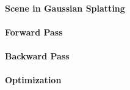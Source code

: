 \paragraph{Scene in Gaussian Splatting}


\paragraph{Forward Pass}


\paragraph{Backward Pass}


\paragraph{Optimization}

